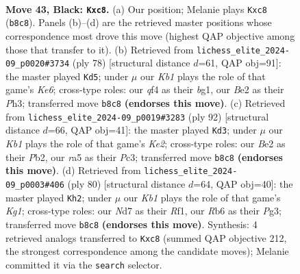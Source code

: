 \documentclass[11pt]{article}
\begin{document}
\clearpage

\begin{figure}[p]\centering
\begin{subfigure}{0.46\textwidth}\centering
\resizebox{\linewidth}{!}{%
\newchessgame
\chessboard[
  setfen={1kR5/1p1n4/1r1p4/R7/1P2PQ2/8/K3b1PP/8 b - - 0 43},
  showmover=false,
  pgfstyle=straightmove, color=movearrow, markmove={b8-c8}
]}
\caption{}
\end{subfigure}\hfill
\begin{subfigure}{0.46\textwidth}\centering
\resizebox{\linewidth}{!}{%
\newchessgame
\chessboard[
  setfen={8/6k1/1p2Kr1p/1P2R1p1/3N4/4P2P/8/6b1 w - - 11 40},
  showmover=false,
  pgfstyle=straightmove, color=movearrow, markmove={e6-d5}
]}
\caption{}
\end{subfigure}
\\[4pt]
\begin{subfigure}{0.46\textwidth}\centering
\resizebox{\linewidth}{!}{%
\newchessgame
\chessboard[
  setfen={2k2r2/6R1/1pp3P1/4p3/1p2r3/2P5/1P2KP2/5R2 w - - 1 47},
  showmover=false,
  pgfstyle=straightmove, color=movearrow, markmove={e2-d3}
]}
\caption{}
\end{subfigure}\hfill
\begin{subfigure}{0.46\textwidth}\centering
\resizebox{\linewidth}{!}{%
\newchessgame
\chessboard[
  setfen={5rk1/8/2Q5/3p1Pp1/1Ppq4/6P1/6P1/5RK1 w - - 15 41},
  showmover=false,
  pgfstyle=straightmove, color=movearrow, markmove={g1-h2}
]}
\caption{}
\end{subfigure}
\caption{\textbf{Move 43, Black: \texttt{Kxc8}.} (a) Our position; Melanie plays \texttt{Kxc8} (\texttt{b8c8}). Panels (b)--(d) are the retrieved master positions whose correspondence most drove this move (highest QAP objective among those that transfer to it). (b) Retrieved from \texttt{lichess\_elite\_2024-09\_p0020\#3734} (ply 78) [structural distance $d$=61, QAP obj=91]: the master played \texttt{Kd5}; under $\mu$ our \emph{Kb1} plays the role of that game's \emph{Ke6}; cross-type roles: our \emph{q}f4 as their \emph{b}g1, our \emph{B}e2 as their \emph{P}h3; transferred move \texttt{b8c8} \textbf{(endorses this move)}. (c) Retrieved from \texttt{lichess\_elite\_2024-09\_p0019\#3283} (ply 92) [structural distance $d$=66, QAP obj=41]: the master played \texttt{Kd3}; under $\mu$ our \emph{Kb1} plays the role of that game's \emph{Ke2}; cross-type roles: our \emph{B}e2 as their \emph{P}b2, our \emph{r}a5 as their \emph{P}c3; transferred move \texttt{b8c8} \textbf{(endorses this move)}. (d) Retrieved from \texttt{lichess\_elite\_2024-09\_p0003\#406} (ply 80) [structural distance $d$=64, QAP obj=40]: the master played \texttt{Kh2}; under $\mu$ our \emph{Kb1} plays the role of that game's \emph{Kg1}; cross-type roles: our \emph{N}d7 as their \emph{R}f1, our \emph{R}b6 as their \emph{P}g3; transferred move \texttt{b8c8} \textbf{(endorses this move)}. Synthesis: 4 retrieved analogs transferred to \texttt{Kxc8} (summed QAP objective 212, the strongest correspondence among the candidate moves); Melanie committed it via the \texttt{search} selector.}
\label{fig:thought-m85}
\end{figure}
\end{document}
